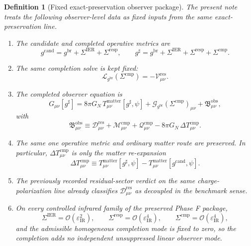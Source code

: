\documentclass[11pt]{article}
\newcommand{\ObserverMetric}{g^{\mathrm{br}}}
\newcommand{\CandidateMetric}{g^{\mathrm{cand}}}
\newcommand{\CompletedMetric}{g^{\sharp}}
\newcommand{\BaseShift}{\Sigma^{\mathrm{IER}}}
\newcommand{\ResponseShift}{\Sigma^{\mathrm{resp}}}
\newcommand{\CompShift}{\Sigma^{\mathrm{cmp}}}
\newcommand{\ResidualCore}{\mathcal V_{\mu\nu}^{\mathrm{res}}}
\newcommand{\ResidualDec}{\mathcal D_{\mu\nu}^{\mathrm{res}}}
\newcommand{\ReducedEin}{\mathcal L_{\ObserverMetric}}
\newcommand{\GaugeBook}{\mathcal G_{\ObserverMetric}}
\newcommand{\CompMix}{\mathcal M_{\mu\nu}^{\mathrm{cmp}}}
\newcommand{\CompQuad}{\mathcal Q_{\mu\nu}^{\mathrm{cmp}}}
\newcommand{\DeltaTComp}{\Delta T_{\mu\nu}^{\mathrm{cmp}}}
\newcommand{\ObsBurden}{\mathfrak B_{\mu\nu}^{\mathrm{obs}}}
\newcommand{\epsIR}{\varepsilon_{\mathrm{IR}}}
\newtheorem{definition}{Definition}
\begin{document}
\begin{definition}[Fixed exact-preservation observer package]
\label{def:fixed}
The present note treats the following observer-level data as fixed inputs from the same exact-preservation line.
\begin{enumerate}
    \item The candidate and completed operative metrics are
    \begin{equation}
    \CandidateMetric
    =
    \ObserverMetric+\BaseShift+\ResponseShift,
    \qquad
    \CompletedMetric
    =
    \ObserverMetric+\BaseShift+\ResponseShift+\CompShift.
    \label{eq:metrics}
    \end{equation}
    \item The same completion solve is kept fixed:
    \begin{equation}
    \ReducedEin(\CompShift)=-\ResidualCore.
    \label{eq:solve}
    \end{equation}
    \item The completed observer equation is
    \begin{equation}
    G_{\mu\nu}[\CompletedMetric]
    =
    8\pi G_N\,T_{\mu\nu}^{\mathrm{matter}}[\CompletedMetric,\psi]
    +\GaugeBook(\CompShift)_{\mu\nu}
    +\ObsBurden,
    \label{eq:completed}
    \end{equation}
    with
    \begin{equation}
    \ObsBurden
    \equiv
    \ResidualDec+\CompMix+\CompQuad-8\pi G_N\,\DeltaTComp.
    \label{eq:burden}
    \end{equation}
    \item The same one operative metric and ordinary matter route are preserved. In particular, \(\DeltaTComp\) is only the matter re-expansion
    \begin{equation}
    \DeltaTComp
    \equiv
    T_{\mu\nu}^{\mathrm{matter}}[\CompletedMetric,\psi]
    -
    T_{\mu\nu}^{\mathrm{matter}}[\CandidateMetric,\psi].
    \label{eq:deltat}
    \end{equation}
    \item The previously recorded residual-sector verdict on the same charge-polarization line already classifies \(\ResidualDec\) as decoupled in the benchmark sense.
    \item On every controlled infrared family of the preserved Phase F package,
    \begin{equation}
    \BaseShift=\mathcal O(\epsIR^2),
    \qquad
    \ResponseShift=\mathcal O(\epsIR^4),
    \qquad
    \CompShift=\mathcal O(\epsIR^4),
    \label{eq:orders}
    \end{equation}
    and the admissible homogeneous completion mode is fixed to zero, so the completion adds no independent unsuppressed linear observer mode.
\end{enumerate}
\end{definition}
\end{document}
